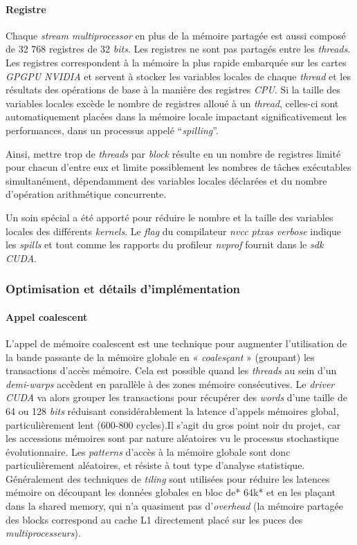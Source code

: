\documentclass[french, 11pt]{memoir}
\begin{document}
\paragraph{Registre}\label{registre}

Chaque \emph{stream multiprocessor} en plus de la mémoire partagée est
aussi composé de 32 768 registres de 32 \emph{bits}. Les registres ne
sont pas partagés entre les \emph{threads}. Les registres correspondent
à la mémoire la plus rapide embarquée sur les cartes \emph{GPGPU NVIDIA}
et servent à stocker les variables locales de chaque \emph{thread} et
les résultats des opérations de base à la manière des registres
\emph{CPU}. Si la taille des variables locales excède le nombre de
registres alloué à un \emph{thread}, celles-ci sont automatiquement
placées dans la mémoire locale impactant significativement les
performances, dans un processus appelé ``\emph{spilling}''.

Ainsi, mettre trop de \emph{threads} par \emph{block} résulte en un
nombre de registres limité pour chacun d'entre eux et limite
possiblement les nombres de tâches exécutables simultanément,
dépendamment des variables locales déclarées et du nombre d'opération
arithmétique concurrente.

Un soin spécial a été apporté pour réduire le nombre et la taille des
variables locales des différents \emph{kernels}. Le \emph{flag} du
compilateur \emph{nvcc ptxas verbose} indique les \emph{spills} et tout
comme les rapports du profileur \emph{nvprof} fournit dans le \emph{sdk
	CUDA}.

\subsubsection{Optimisation et détails
	d'implémentation}\label{optimisation-et-duxe9tails-dimpluxe9mentation}

\paragraph{Appel coalescent}\label{appel-coalescent}

L'appel de mémoire coalescent est une technique pour augmenter
l'utilisation de la bande passante de la mémoire globale en «
\emph{coalesçant }» (groupant) les transactions d'accès mémoire. Cela
est possible quand les \emph{threads} au sein d'un \emph{demi-warps}
accèdent en parallèle à des zones mémoire consécutives. Le \emph{driver
	CUDA} va alors grouper les transactions pour récupérer des \emph{words}
d'une taille de 64 ou 128 \emph{bits} réduisant considérablement la
latence d'appels mémoires global, particulièrement lent (600-800
cycles).Il s'agit du gros point noir du projet, car les accessions
mémoires sont par nature aléatoires vu le processus stochastique
évolutionnaire. Les \emph{patterns} d'accès à la mémoire globale sont
donc particulièrement aléatoires, et résiste à tout type d'analyse
statistique. Généralement des techniques de \emph{tiling} sont utilisées
pour réduire les latences mémoire on découpant les données globales en
bloc de* 64k* et en les plaçant dans la shared memory, qui n'a quasiment
pas d'\emph{overhead} (la mémoire partagée des blocks correspond au
cache L1 directement placé sur les puces des \emph{multiprocesseurs}).
\end{document}

